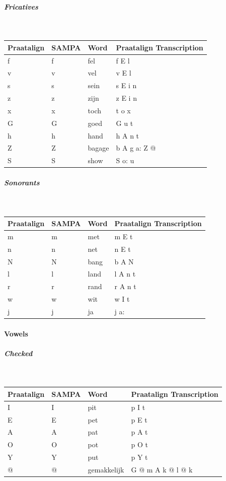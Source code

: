 \documentclass[twoside,a4paper]{book}
\begin{document}
\subparagraph{Fricatives}\strut\\
\begin{tabular}{llll}
	Praatalign & SAMPA & Word & Praatalign Transcription\\
	\hline
	f & f & fel & f E l\\
	v & v & vel & v E l\\
	s & s & sein & s E i n\\
	z & z & zijn & z E i n\\
	x & x & toch & t o x\\
	G & G & goed & G u t\\
	h & h & hand & h A n t\\
	Z & Z & bagage & b A g a: Z @\\
	S & S & show & S o: u
\end{tabular}

\subparagraph{Sonorants}\strut\\
\begin{tabular}{llll}
	Praatalign & SAMPA & Word & Praatalign Transcription\\
	\hline
	m & m & met & m E t\\
	n & n & net & n E t\\
	N & N & bang & b A N\\
	l & l & land & l A n t\\
	r & r & rand & r A n t\\
	w & w & wit & w I t\\
	j & j & ja & j a:
\end{tabular}

\paragraph{Vowels}
\subparagraph{Checked}\strut\\
\begin{tabular}{llll}
	Praatalign & SAMPA & Word & Praatalign Transcription\\
	\hline
	I & I & pit & p I t\\
	E & E & pet & p E t\\
	A & A & pat & p A t\\
	O & O & pot & p O t\\
	Y & Y & put & p Y t\\
	@ & @ & gemakkelijk & G @ m A k @ l @ k
\end{tabular}
\end{document}
